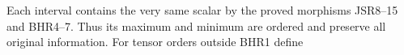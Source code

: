 Each interval contains the very same scalar by the
proved morphisms JSR8--15 and BHR4--7. Thus its maximum
and minimum are ordered and preserve all original
information. For tensor orders outside BHR1 define